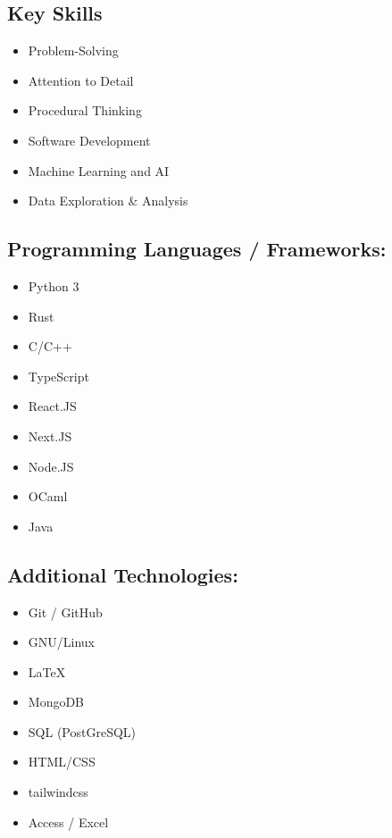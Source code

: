 \documentclass[9pt]{extarticle}
\begin{document}
\begin{minipage}{0.3\textwidth}
	\raggedright
	\begin{tcolorbox}[colback=grey]

		\section{Key Skills}

		\begin{itemize}[leftmargin=*]
			\item Problem-Solving
			\item Attention to Detail
			\item Procedural Thinking
			\item Software Development
			\item Machine Learning and AI
			\item Data Exploration \& Analysis

		\end{itemize}

		\subsection{Programming Languages / Frameworks:}
		\begin{itemize}[leftmargin=*]

			\item Python 3
			\item Rust
			\item C/C++
			\item TypeScript
			\item React.JS
			\item Next.JS
			\item Node.JS
			\item OCaml
			\item Java


		\end{itemize}

		\subsection{Additional Technologies:}
		\begin{itemize}[leftmargin=*]
			\item Git / GitHub
			\item GNU/Linux
			\item LaTeX
			\item MongoDB
			\item SQL (PostGreSQL)
			\item HTML/CSS
			\item tailwindcss
			\item Access / Excel
		\end{itemize}

	\end{tcolorbox}

\end{minipage}
\end{document}
